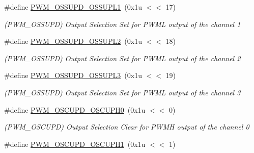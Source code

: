 \begin{DoxyCompactItemize}
\mbox{\label{group__SAME70__PWM_ga3326e4bb5f84da296e7ac992ac029553}} 
\#define \mbox{\hyperlink{group__SAME70__PWM_ga3326e4bb5f84da296e7ac992ac029553}{P\+W\+M\+\_\+\+O\+S\+S\+U\+P\+D\+\_\+\+O\+S\+S\+U\+P\+L1}}~(0x1u $<$$<$ 17)
\begin{DoxyCompactList}\small\item\em (P\+W\+M\+\_\+\+O\+S\+S\+U\+PD) Output Selection Set for P\+W\+ML output of the channel 1 \end{DoxyCompactList}\item 
\mbox{\label{group__SAME70__PWM_ga3e9d15e834de3bb5db7f1549d86f1a57}} 
\#define \mbox{\hyperlink{group__SAME70__PWM_ga3e9d15e834de3bb5db7f1549d86f1a57}{P\+W\+M\+\_\+\+O\+S\+S\+U\+P\+D\+\_\+\+O\+S\+S\+U\+P\+L2}}~(0x1u $<$$<$ 18)
\begin{DoxyCompactList}\small\item\em (P\+W\+M\+\_\+\+O\+S\+S\+U\+PD) Output Selection Set for P\+W\+ML output of the channel 2 \end{DoxyCompactList}\item 
\mbox{\label{group__SAME70__PWM_ga2e53b31cb8b3a9ce73db36088eb131f1}} 
\#define \mbox{\hyperlink{group__SAME70__PWM_ga2e53b31cb8b3a9ce73db36088eb131f1}{P\+W\+M\+\_\+\+O\+S\+S\+U\+P\+D\+\_\+\+O\+S\+S\+U\+P\+L3}}~(0x1u $<$$<$ 19)
\begin{DoxyCompactList}\small\item\em (P\+W\+M\+\_\+\+O\+S\+S\+U\+PD) Output Selection Set for P\+W\+ML output of the channel 3 \end{DoxyCompactList}\item 
\mbox{\label{group__SAME70__PWM_gaf19f80cf218be24bc6d033802d46735d}} 
\#define \mbox{\hyperlink{group__SAME70__PWM_gaf19f80cf218be24bc6d033802d46735d}{P\+W\+M\+\_\+\+O\+S\+C\+U\+P\+D\+\_\+\+O\+S\+C\+U\+P\+H0}}~(0x1u $<$$<$ 0)
\begin{DoxyCompactList}\small\item\em (P\+W\+M\+\_\+\+O\+S\+C\+U\+PD) Output Selection Clear for P\+W\+MH output of the channel 0 \end{DoxyCompactList}\item 
\mbox{\label{group__SAME70__PWM_ga7520de992c0db573287f89908f651fa7}} 
\#define \mbox{\hyperlink{group__SAME70__PWM_ga7520de992c0db573287f89908f651fa7}{P\+W\+M\+\_\+\+O\+S\+C\+U\+P\+D\+\_\+\+O\+S\+C\+U\+P\+H1}}~(0x1u $<$$<$ 1)
$$
\end{DoxyCompactItemize}
